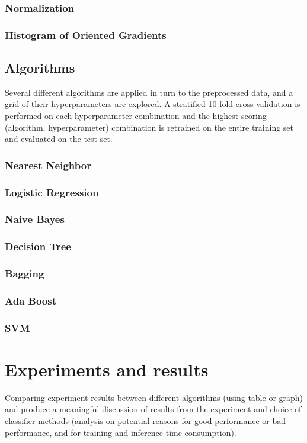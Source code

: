 \documentclass[landscape,twocolumn]{article}
\begin{document}
\subsubsection{Normalization}
\subsubsection{Histogram of Oriented Gradients}

\subsection{Algorithms}
Several different algorithms are applied in turn to the preprocessed data, and a grid of their hyperparameters are explored. A stratified 10-fold cross validation is performed on each hyperparameter combination and the highest scoring (algorithm, hyperparameter) combination is retrained on the entire training set and evaluated on the test set.

\subsubsection{Nearest Neighbor}
\subsubsection{Logistic Regression}
\subsubsection{Naive Bayes}
\subsubsection{Decision Tree}
\subsubsection{Bagging}
\subsubsection{Ada Boost}
\subsubsection{SVM}

\section{Experiments and results}
Comparing experiment results between different algorithms (using table or graph) and produce a meaningful discussion of results from the experiment and choice of classifier methods (analysis on potential reasons for good performance or bad performance, and for training and inference time consumption).
\end{document}
